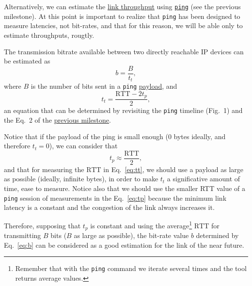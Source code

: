 Alternatively, we can estimate the
\href{https://en.wikipedia.org/wiki/Throughput}{link throughput} using
\href{https://github.com/torvalds/linux/blob/master/net/ipv4/ping.c}{\texttt{ping}}
(see the previous milestone). At this point is important to realize
that \texttt{ping} has been designed to measure latencies, not
bit-rates, and that for this reason, we will be able only to estimate
throughputs, rougtly.

The transmission bitrate available between two directly reachable IP
devices can be estimated as
\begin{equation}
  b=\frac{B}{t_t},
  \label{eq:b}
\end{equation}
where $B$ is the number of bits sent in a \verb|ping|
\href{https://en.wikipedia.org/wiki/Payload_(computing)}{payload}, and
\begin{equation}
  t_t = \frac{\text{RTT}-2t_p}{2},
  \label{eq:tt}
\end{equation}
an equation that can be determined by revisiting the \verb|ping|
timeline (Fig.~1) and the Eq.~2 of the
\href{https://tecnologias-multimedia.github.io/study_guide/06-jitter_impact/}{previous
  milestone}.

Notice that if the payload of the ping is small enough ($0$ bytes
ideally, and therefore $t_t=0$), we can consider that
\begin{equation}
  t_p \approx \frac{\text{RTT}}{2},
  \label{eq:tp}
\end{equation}
and that for measuring the $\text{RTT}$ in
Eq.~\ref{eq:tt}, we should use a payload as large as possible
(ideally, infinite bytes), in order to make $t_t$ a significative
amount of time, ease to measure. Notice also that we should use the
smaller RTT value of a \texttt{ping} session of measurements in the
Eq.~\ref{eq:tp} because the minimum link latency is a constant and the
congestion of the link always increases it.

Therefore, supposing that $t_p$ is constant and using the
average\footnote{Remember that with the \texttt{ping} command we
iterate several times and the tool returns average values.}
$\text{RTT}$ for transmitting $B$ bits ($B$ as
large as possible), the bit-rate value $b$ determined by
Eq.~\ref{eq:b} can be considered as a good estimation for the link of
the near future.

